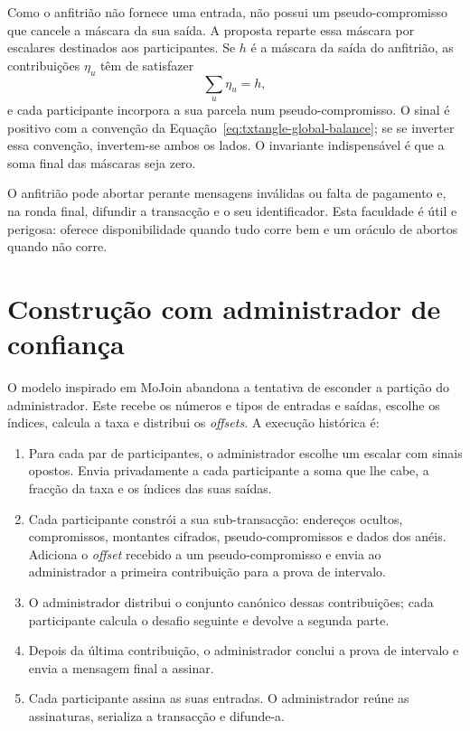 Como o anfitrião não fornece uma entrada, não possui um pseudo-compromisso que
cancele a máscara da sua saída. A proposta reparte essa máscara por escalares
destinados aos participantes. Se \(h\) é a máscara da saída do anfitrião, as
contribuições \(\eta_u\) têm de satisfazer
\[
 \sum_u\eta_u=h,
\]
e cada participante incorpora a sua parcela num pseudo-compromisso. O sinal
é positivo com a convenção da Equação~\eqref{eq:txtangle-global-balance}; se se
inverter essa convenção, invertem-se ambos os lados. O invariante indispensável
é que a soma final das máscaras seja zero.

O anfitrião pode abortar perante mensagens inválidas ou falta de pagamento e,
na ronda final, difundir a transacção e o seu identificador. Esta faculdade é
útil e perigosa: oferece disponibilidade quando tudo corre bem e um oráculo de
abortos quando não corre.

\section{Construção com administrador de confiança}
\label{sec:dealer-txtangle}

O modelo inspirado em MoJoin abandona a tentativa de esconder a partição do
administrador. Este recebe os números e tipos de entradas e saídas, escolhe os
índices, calcula a taxa e distribui os \emph{offsets}. A execução histórica é:

\begin{enumerate}
 \item Para cada par de participantes, o administrador escolhe um escalar com
 sinais opostos. Envia privadamente a cada participante a soma que lhe cabe,
 a fracção da taxa e os índices das suas saídas.

 \item Cada participante constrói a sua sub-transacção: endereços ocultos,
 compromissos, montantes cifrados, pseudo-compromissos e dados dos anéis.
 Adiciona o \emph{offset} recebido a um pseudo-compromisso e envia ao
 administrador a primeira contribuição para a prova de intervalo.

 \item O administrador distribui o conjunto canónico dessas contribuições;
 cada participante calcula o desafio seguinte e devolve a segunda parte.

 \item Depois da última contribuição, o administrador conclui a prova de
 intervalo e envia a mensagem final a assinar.

 \item Cada participante assina as suas entradas. O administrador reúne as
 assinaturas, serializa a transacção e difunde-a.
\end{enumerate}

